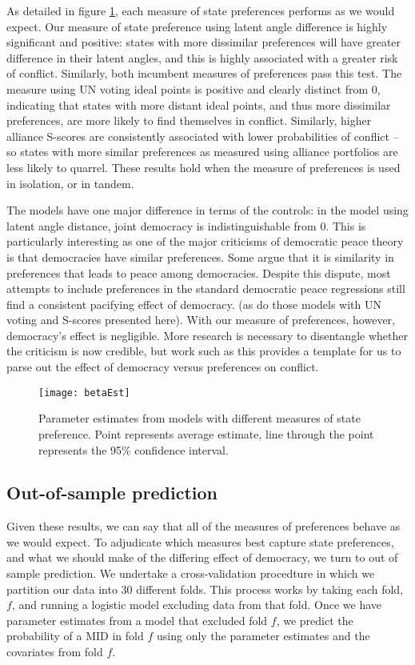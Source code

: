 As detailed in figure \ref{fig:coefP}, each measure of state preferences performs as we would expect. Our measure of state preference using latent angle difference is highly significant and positive: states with more dissimilar preferences will have greater difference in their latent angles, and this is highly associated with a greater risk of conflict. Similarly, both incumbent measures of preferences pass this test. The measure using UN voting ideal points is positive and clearly distinct from $0$, indicating that states with more distant ideal points, and thus more dissimilar preferences, are more likely to find themselves in conflict. Similarly, higher alliance S-scores are consistently associated with lower probabilities of conflict -- so states with more similar preferences as measured using alliance portfolios are less likely to quarrel. These results hold when the measure of preferences is used in isolation, or in tandem.

The models have one major difference in terms of the controls: in the model using latent angle distance, joint democracy is indistinguishable from $0$. This is particularly interesting as one of the major criticisms of democratic peace theory is that democracies have similar preferences. Some argue that it is similarity in preferences that leads to peace among democracies.  Despite this dispute, most attempts to include preferences in the standard democratic peace regressions still find a consistent pacifying effect of democracy.
(as do those models with UN voting and S-scores presented here). With our measure of preferences, however, democracy's effect is negligible. More research is necessary to disentangle whether the criticism is now credible, but work such as this provides a template for us to parse out the effect of democracy versus preferences on conflict.


\begin{figure}[ht]
	\centering
	\texttt{[image: betaEst]}
	\caption{Parameter estimates from models with different measures of state preference. Point represents average estimate, line through the point represents the 95\% confidence interval.}
	\label{fig:coefP}
\end{figure}
\FloatBarrier

\subsection*{Out-of-sample prediction}

Given these results, we can say that all of the measures of preferences behave as we would expect. To adjudicate which measures best capture state preferences, and what we should make of the differing effect of democracy, we turn to out of sample prediction. We undertake a cross-validation procedture in which we partition our data into 30 different folds. This process works by taking each fold, $f$, and running a logistic model excluding data from that fold. Once we have parameter estimates from a model that excluded fold $f$, we predict the probability of a MID in fold $f$ using only the parameter estimates and the covariates from fold $f$.


